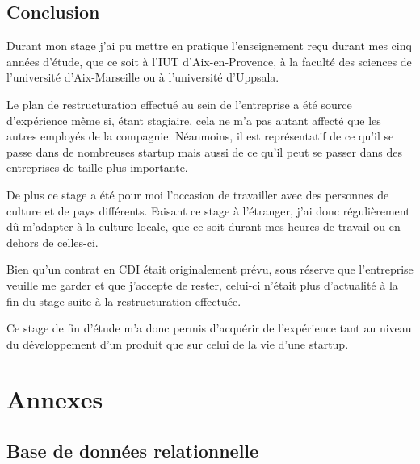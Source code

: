 \documentclass[a4paper,10pt, twoside]{report}
\begin{document}
\begin{spacing}{1.2}
\chapter{Conclusion}
\thispagestyle{fancy}

Durant mon stage j'ai pu mettre en pratique l'enseignement reçu durant mes cinq
années d'étude, que ce soit à l'IUT d'Aix-en-Provence, à la faculté des sciences
de l'université d'Aix-Marseille ou à l'université d'Uppsala.

Le plan de restructuration effectué au sein de l'entreprise a été
source d'expérience même si, étant stagiaire, cela ne m'a pas autant
affecté que les autres employés de la compagnie. Néanmoins, il est
représentatif de ce qu'il se passe dans de nombreuses startup mais aussi de
ce qu'il peut se passer dans des entreprises de taille plus importante.

De plus ce stage a été pour moi l'occasion de travailler avec des personnes
de culture et de pays différents. Faisant ce stage à l'étranger, j'ai donc
régulièrement dû m'adapter à la culture locale, que ce soit durant mes
heures de travail ou en dehors de celles-ci.

Bien qu'un contrat en CDI était originalement prévu, sous réserve que
l'entreprise veuille me garder et que j'accepte de rester, celui-ci n'était
plus d'actualité à la fin du stage suite à la restructuration effectuée.

Ce stage de fin d'étude m'a donc permis d'acquérir de l'expérience tant au
niveau du développement d'un produit que sur celui de la vie d'une startup.

\newpage
\listoffigures \thispagestyle{fancy}
\listoftables \thispagestyle{fancy}

 \thispagestyle{fancy}

\appendix
\makeatletter
\def\@seccntformat#1{Annexe~\csname the#1\endcsname:\quad}
\makeatother
\part{Annexes}
\chapter{Base de données relationnelle}
\thispagestyle{fancy}
\label{annBDR}
\thispagestyle{fancy}

\end{spacing}
\end{document}
